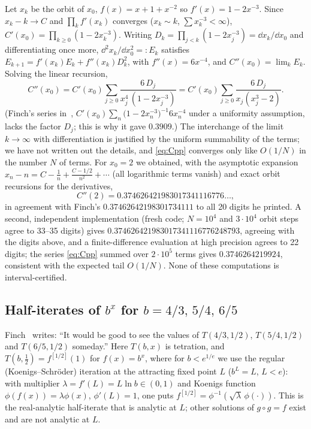 Let $x_k$ be the orbit of $x_0$, $f(x)=x+1+x^{-2}$ so $f'(x)=1-2x^{-3}$. Since $x_k-k\to C$ and $\prod_k f'(x_k)$ converges ($x_k\sim k$, $\sum x_k^{-3}<\infty$), $C'(x_0)=\prod_{k\ge0}(1-2x_k^{-3})$. Writing $D_k=\prod_{j<k}(1-2x_j^{-3})=\dd x_k/\dd x_0$ and differentiating once more, $\dd^2x_k/\dd x_0^2=:E_k$ satisfies $E_{k+1}=f'(x_k)E_k+f''(x_k)D_k^2$, with $f''(x)=6x^{-4}$, and $C''(x_0)=\lim_kE_k$. Solving the linear recursion,
\begin{equation}\label{eq:Cpp}
C''(x_0)=C'(x_0)\sum_{j\ge0}\frac{6\,D_j}{x_j^{4}\,(1-2x_j^{-3})}=C'(x_0)\sum_{j\ge0}\frac{6\,D_j}{x_j(x_j^3-2)} .
\end{equation}
(Finch's series in~\cite{FinchIII}, $C'(x_0)\sum_n\big(1-2x_n^{-3}\big)^{-1}6x_n^{-4}$ under a uniformity assumption, lacks the factor $D_j$; this is why it gave $0.3909$.) The interchange of the limit $k\to\infty$ with differentiation is justified by the uniform summability of the terms; we have not written out the details, and \eqref{eq:Cpp} converges only like $O(1/N)$ in the number $N$ of terms. For $x_0=2$ we obtained, with the asymptotic expansion $x_n-n=C-\frac1n+\frac{C-1/2}{n^2}+\cdots$ (all logarithmic terms vanish) and exact orbit recursions for the derivatives,
\[
C''(2)=0.374626421983017341116776\ldots,
\]
in agreement with Finch's $0.37462642198301734111$ to all 20 digits he printed. A second, independent implementation (fresh code; $N=10^4$ and $3\cdot10^4$ orbit steps agree to 33--35 digits) gives $0.374626421983017341116776248793$, agreeing with the digits above, and a finite-difference evaluation at high precision agrees to 22 digits; the series \eqref{eq:Cpp} summed over $2\cdot10^5$ terms gives $0.3746264219924$, consistent with the expected tail $O(1/N)$. None of these computations is interval-certified.

\subsection{Half-iterates of $b^x$ for $b=4/3,\,5/4,\,6/5$}
Finch~\cite{FinchIV} writes: ``It would be good to see the values of $T(4/3,1/2)$, $T(5/4,1/2)$ and $T(6/5,1/2)$ someday.'' Here $T(b,x)$ is tetration, and $T(b,\tfrac12)=f^{[1/2]}(1)$ for $f(x)=b^x$, where for $b<e^{1/e}$ we use the regular (Koenigs--Schr\"oder) iteration at the attracting fixed point $L$ ($b^L=L$, $L<e$): with multiplier $\lambda=f'(L)=L\ln b\in(0,1)$ and Koenigs function $\phi(f(x))=\lambda\phi(x)$, $\phi'(L)=1$, one puts $f^{[1/2]}=\phi^{-1}(\sqrt\lambda\,\phi(\cdot))$. This is the real-analytic half-iterate that is analytic at $L$; other solutions of $g\circ g=f$ exist and are not analytic at $L$.

